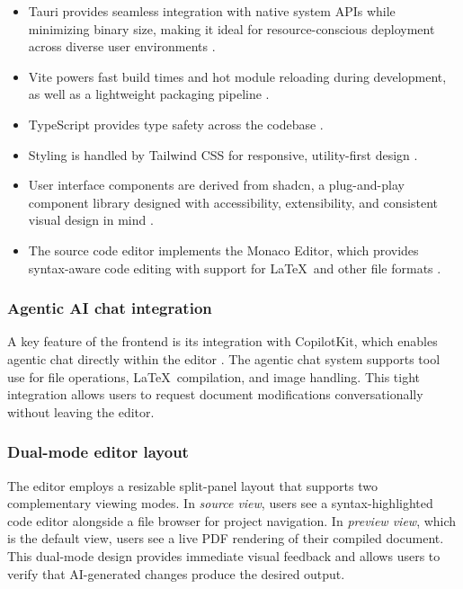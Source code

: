 \begin{itemize}
    \item Tauri provides seamless integration with native system APIs while minimizing binary size, making it ideal for resource-conscious deployment across diverse user environments \cite{tauri}.
    \item Vite powers fast build times and hot module reloading during development, as well as a lightweight packaging pipeline \cite{vite}.
    \item TypeScript provides type safety across the codebase \cite{typescript}.
    \item Styling is handled by Tailwind CSS for responsive, utility-first design \cite{tailwind}.
    \item User interface components are derived from shadcn, a plug-and-play component library designed with accessibility, extensibility, and consistent visual design in mind \cite{shadcn}.
    \item The source code editor implements the Monaco Editor, which provides syntax-aware code editing with support for \LaTeX\ and other file formats \cite{monaco}.
\end{itemize}

\subsubsection{Agentic AI chat integration}

A key feature of the frontend is its integration with CopilotKit, which enables agentic chat directly within the editor \cite{copilotkit}.
The agentic chat system supports tool use for file operations, \LaTeX\ compilation, and image handling.
This tight integration allows users to request document modifications conversationally without leaving the editor.

\subsubsection{Dual-mode editor layout}

The editor employs a resizable split-panel layout that supports two complementary viewing modes.
In \emph{source view}, users see a syntax-highlighted code editor alongside a file browser for project navigation.
In \emph{preview view}, which is the default view, users see a live PDF rendering of their compiled document.
This dual-mode design provides immediate visual feedback and allows users to verify that AI-generated changes produce the desired output.

